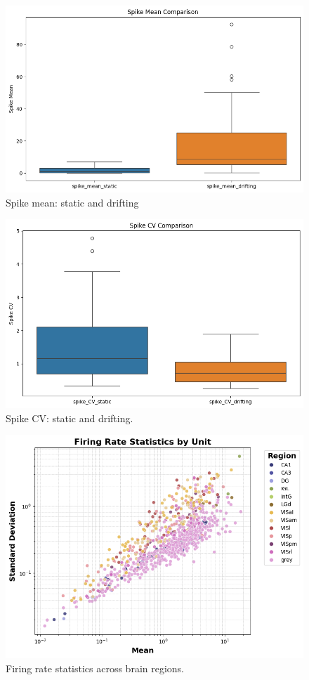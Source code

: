\documentclass[10pt,twocolumn]{article}
\begin{document}
\begin{figure}[ht]
\centering
\includegraphics[width=0.85\linewidth]{report_images/spike_mean_comparison.png}
\caption{Spike mean: static and drifting}
\label{fig:spike_mean}
\end{figure}

\begin{figure}[ht]
\centering
\includegraphics[width=0.85\linewidth]{report_images/spike_CV_comparison.png}
\caption{Spike CV: static and drifting.}
\label{fig:spike_cv}
\end{figure}

\begin{figure}[ht]
\centering
\includegraphics[width=\linewidth]{report_images/unit_firing_rate_statistics.png}
\caption{Firing rate statistics across brain regions.}
\label{fig:firing_rate_stats}
\end{figure}
\end{document}
